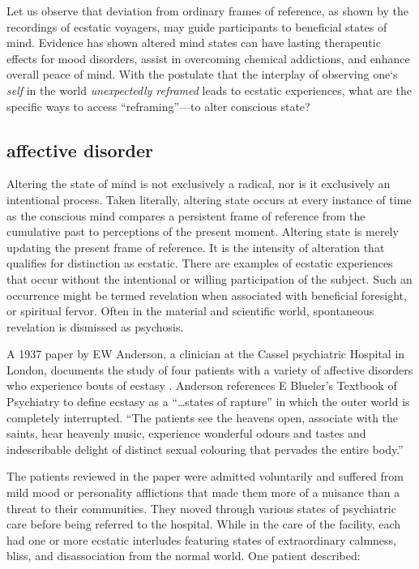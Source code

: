 \documentclass{UIdahoMastersThesis}
\begin{document}
Let us observe that deviation from ordinary frames of reference, as shown by the recordings of ecstatic voyagers, may guide participants to beneficial states of mind. Evidence has shown altered mind states can have lasting therapeutic effects for mood disorders, assist in overcoming chemical addictions, and enhance overall peace of mind. With the postulate that the interplay of observing one`s \emph{self} in the world \emph{unexpectedly reframed} leads to ecstatic experiences, what are the specific ways to access ``reframing''---to alter conscious state?

\subsection{affective disorder}

Altering the state of mind is not exclusively a radical, nor is it exclusively an intentional process. Taken literally, altering state occurs at every instance of time as the conscious mind compares a persistent frame of reference from the cumulative past to perceptions of the present moment. Altering state is merely updating the present frame of reference. It is the intensity of alteration that qualifies for distinction as ecstatic. There are examples of ecstatic experiences that occur without the intentional or willing participation of the subject. Such an occurrence might be termed revelation when associated with beneficial foresight, or spiritual fervor. Often in the material and scientific world, spontaneous revelation is dismissed as psychosis.

A 1937 paper by EW Anderson, a clinician at the Cassel psychiatric Hospital in London, documents the study of four patients with a variety of affective disorders who experience bouts of ecstasy \cite{anderson_clinical_1938}. Anderson references E Blueler's Textbook of Psychiatry to define ecstasy as a ``\ldots states of rapture'' in which the outer world is completely interrupted. \enquote{The patients see the heavens open, associate with the saints, hear heavenly music, experience wonderful odours and tastes and indescribable delight of distinct sexual colouring that pervades the entire body.} 

The patients reviewed in the paper were admitted voluntarily and suffered from mild mood or personality afflictions that made them more of a nuisance than a threat to their communities. They moved through various states of psychiatric care before being referred to the hospital. While in the care of the facility, each had one or more ecstatic interludes featuring states of extraordinary calmness, bliss, and disassociation from the normal world. One patient described:
\end{document}
